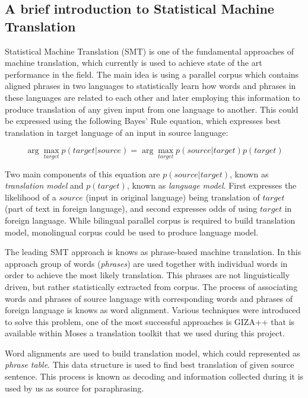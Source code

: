 \subsection{A brief introduction to Statistical Machine Translation} 

Statistical Machine Translation (SMT) is one of the fundamental approaches of machine translation, which currently is used to achieve state of the art performance in the field. The main idea is using a parallel corpus which contains aligned phrases in two languages to statistically learn how words and phrases in these languages are related to each other and later employing this information to produce translation of any given input from one language to another. This could be expressed using the following Bayes' Rule equation, which expresses best translation in target language of an input in source language:

\begin{large}
\begin{equation}
\arg \max_{target} p(target|source) = \arg \max_{target} p(source|target)p(target)
\end{equation}
\end{large}

Two main components of this equation are $p(source|target)$, known as \textit{translation model} and $p(target)$, known as \textit{language model}. First expresses the likelihood of a $source$ (input in original language) being translation of $target$ (part of text in foreign language), and second expresses odds of using $target$ in foreign language. While bilingual parallel corpus is required to build translation model, monolingual corpus could be used to produce language model. 

The leading SMT approach is knows as phrase-based machine translation. In this approach group of words (\textit{phrases}) are used together with individual words in order to achieve the most likely translation. This phrases are not linguistically driven, but rather statistically extracted from corpus. The process of associating words and phrases of source language with corresponding words and phrases of foreign language is knows as word alignment. Various techniques were introduced to solve this problem, one of the most successful approaches is GIZA++ that is available within Moses a translation toolkit that we used during this project.

Word alignments are used to build translation model, which could represented as \textit{phrase table}. This data structure is used to find best translation of given source sentence. This process is known as decoding and information collected during it is used by us as source for paraphrasing.

